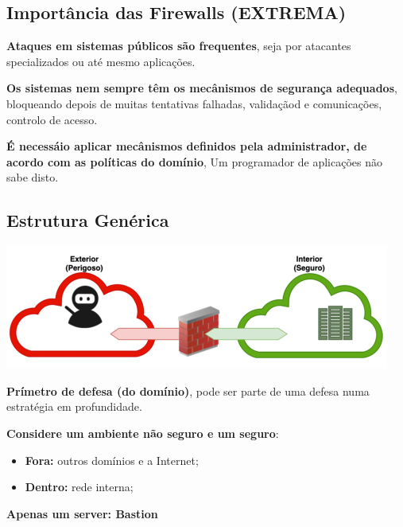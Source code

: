 \documentclass{article}
\begin{document}
\pagebreak
\subsection{Importância das Firewalls (EXTREMA)}

\begin{flushleft}
  \textbf{Ataques em sistemas públicos são frequentes}, seja por atacantes specializados
  ou até mesmo aplicações.

  \vspace{2mm}

  \textbf{Os sistemas nem sempre têm os mecânismos de segurança adequados}, bloqueando
  depois de muitas tentativas falhadas, validaçãod e comunicações, controlo de acesso.

  \vspace{2mm}

  \textbf{É necessáio aplicar mecânismos definidos pela administrador,
  de acordo com as políticas do domínio}, Um programador de aplicações não
  sabe disto.
\end{flushleft}

\subsection{Estrutura Genérica}

\begin{center}
  \includegraphics[scale=0.4]{52}
\end{center}

\begin{flushleft}
  \textbf{Prímetro de defesa (do domínio)}, pode ser parte de uma defesa numa
  estratégia em profundidade.

  \vspace{2mm}

  \textbf{Considere um ambiente não seguro e um seguro}:
  \begin{itemize}
    \item \textbf{Fora:} outros domínios e a Internet;
    \item \textbf{Dentro:} rede interna;
  \end{itemize}

  \vspace{2mm}

  \textbf{Apenas um server: Bastion}
\end{flushleft}
\end{document}
